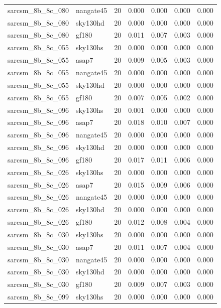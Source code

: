 \begin{tabular}{llrrrrr}
sarcsm\_8b\_8c\_080 & nangate45 & 20 & 0.000 & 0.000 & 0.000 & 0.000 \\
sarcsm\_8b\_8c\_080 & sky130hd & 20 & 0.000 & 0.000 & 0.000 & 0.000 \\
sarcsm\_8b\_8c\_080 & gf180 & 20 & 0.011 & 0.007 & 0.003 & 0.000 \\
sarcsm\_8b\_8c\_055 & sky130hs & 20 & 0.000 & 0.000 & 0.000 & 0.000 \\
sarcsm\_8b\_8c\_055 & asap7 & 20 & 0.009 & 0.005 & 0.003 & 0.000 \\
sarcsm\_8b\_8c\_055 & nangate45 & 20 & 0.000 & 0.000 & 0.000 & 0.000 \\
sarcsm\_8b\_8c\_055 & sky130hd & 20 & 0.000 & 0.000 & 0.000 & 0.000 \\
sarcsm\_8b\_8c\_055 & gf180 & 20 & 0.007 & 0.005 & 0.002 & 0.000 \\
sarcsm\_8b\_8c\_096 & sky130hs & 20 & 0.001 & 0.000 & 0.000 & 0.000 \\
sarcsm\_8b\_8c\_096 & asap7 & 20 & 0.018 & 0.010 & 0.007 & 0.000 \\
sarcsm\_8b\_8c\_096 & nangate45 & 20 & 0.000 & 0.000 & 0.000 & 0.000 \\
sarcsm\_8b\_8c\_096 & sky130hd & 20 & 0.000 & 0.000 & 0.000 & 0.000 \\
sarcsm\_8b\_8c\_096 & gf180 & 20 & 0.017 & 0.011 & 0.006 & 0.000 \\
sarcsm\_8b\_8c\_026 & sky130hs & 20 & 0.000 & 0.000 & 0.000 & 0.000 \\
sarcsm\_8b\_8c\_026 & asap7 & 20 & 0.015 & 0.009 & 0.006 & 0.000 \\
sarcsm\_8b\_8c\_026 & nangate45 & 20 & 0.000 & 0.000 & 0.000 & 0.000 \\
sarcsm\_8b\_8c\_026 & sky130hd & 20 & 0.000 & 0.000 & 0.000 & 0.000 \\
sarcsm\_8b\_8c\_026 & gf180 & 20 & 0.012 & 0.008 & 0.004 & 0.000 \\
sarcsm\_8b\_8c\_030 & sky130hs & 20 & 0.000 & 0.000 & 0.000 & 0.000 \\
sarcsm\_8b\_8c\_030 & asap7 & 20 & 0.011 & 0.007 & 0.004 & 0.000 \\
sarcsm\_8b\_8c\_030 & nangate45 & 20 & 0.000 & 0.000 & 0.000 & 0.000 \\
sarcsm\_8b\_8c\_030 & sky130hd & 20 & 0.000 & 0.000 & 0.000 & 0.000 \\
sarcsm\_8b\_8c\_030 & gf180 & 20 & 0.009 & 0.007 & 0.003 & 0.000 \\
sarcsm\_8b\_8c\_099 & sky130hs & 20 & 0.000 & 0.000 & 0.000 & 0.000 \\

\end{tabular}
